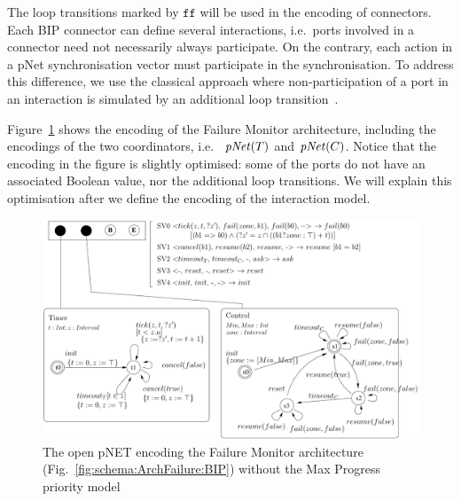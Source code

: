 \documentclass{llncs}
\newcommand{\Simon}{\\\hfill\mdash Simon}
\newcommand{\noteSBin}[2][inline,color=green!40]{\todo[#1]{{#2}\Simon}}
\newcommand{\fig}[1]{Fig.~\ref{fig:#1}}
\newcommand{\Fig}[1]{Figure~\ref{fig:#1}}
\newcommand{\mdash}[1][]{---#1}
\newcommand{\ie}[1][\ ]{i.e.#1}
\newcommand{\eg}[1][\ ]{e.g.#1}
\newcommand{\false}{\ensuremath{\mathtt{f\!f}}}
\newcommand{\nopri}[1][]{\ensuremath{\mathit{pNet}%
    \ifx#1\relax\else(#1)\fi}}
\begin{document}
The loop transitions marked by $\false$ will be used in the encoding
of connectors.  Each BIP connector can define several interactions,
\ie ports involved in a connector need not necessarily always
participate.  On the contrary, each action in a pNet synchronisation
vector must participate in the synchronisation.  To address this
difference, we use the classical approach
where non-participation of a port in an interaction is simulated
by an additional loop transition~\cite{milner83-calculi}.

\Fig{FailureTimer:pNet} shows the encoding of the Failure Monitor
architecture, including the encodings of the two coordinators, \ie
$\nopri[\NameTimer]$ and $\nopri[\NameCtrl]$.  Notice that the
encoding in the figure is slightly optimised: some of the ports do not
have an associated Boolean value, nor the additional loop transitions.
We will explain this optimisation after we define the
encoding of the interaction model.

\begin{figure}[t]
  \centering
  \includegraphics[width=0.9\columnwidth]{FailureTimerPNET-v4}
  \caption{The open pNET encoding the Failure Monitor architecture (\fig{schema:ArchFailure:BIP}) without the Max Progress priority model}
  \label{fig:FailureTimer:pNet}
%
\end{figure}

\end{document}
